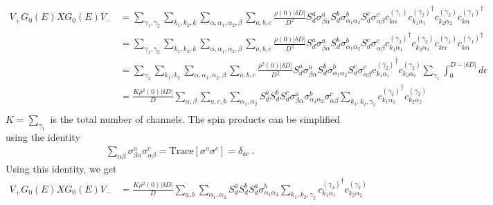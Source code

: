 \documentclass[twoside,11pt]{report}
\numberwithin{equation}{section}
\begin{document}
\begin{equation}\begin{aligned}
	V_+G_0(E)XG_0(E)V_- &=\sum_{\gamma_1,\gamma_2}\sum_{k_1,k_2,k}\sum_{\alpha,\alpha_1,\alpha_2,\beta} \sum_{a,b,c}\frac{\rho(0) |\delta D|}{D^2} S_d^a\sigma^a_{\beta \alpha}S_d^b\sigma^b_{\alpha_1 \alpha_2}S_d^c \sigma^c_{\alpha \beta} c^{(\gamma_1)}_{k\alpha}{c^{(\gamma_2)}_{k_1 \alpha_1}}^\dagger c^{(\gamma_2)}_{k_2 \alpha_2} {c^{(\gamma_1)}_{k\alpha}}^\dagger\\
			    &=\sum_{\gamma_1,\gamma_2}\sum_{k_1,k_2,k}\sum_{\alpha,\alpha_1,\alpha_2,\beta} \sum_{a,b,c}\frac{\rho(0) |\delta D|}{D^2} S_d^a\sigma^a_{\beta \alpha}S_d^b\sigma^b_{\alpha_1 \alpha_2}S_d^c \sigma^c_{\alpha \beta} {c^{(\gamma_2)}_{k_1 \alpha_1}}^\dagger c^{(\gamma_2)}_{k_2 \alpha_2}c^{(\gamma_1)}_{k\alpha}{c^{(\gamma_1)}_{k\alpha}}^\dagger \\
			    &=\sum_{\gamma_2}\sum_{k_1,k_2}\sum_{\alpha,\alpha_1,\alpha_2,\beta} \sum_{a,b,c}\frac{\rho^2(0) |\delta D|}{D^2} S_d^a\sigma^a_{\beta \alpha}S_d^b\sigma^b_{\alpha_1 \alpha_2}S_d^c\sigma^c_{\alpha \beta}{c^{(\gamma_2)}_{k_1 \alpha_1}}^\dagger c^{(\gamma_2)}_{k_2 \alpha_2} \sum_{\gamma_1}\int_{0}^{D - |\delta D|}d \epsilon \\
			    &=\frac{K \rho^2(0) |\delta D|}{D} \sum_{\alpha,\beta} \sum_{a,c,b}\sum_{\alpha_1,\alpha_2}S_d^a S_d^b S_d^c\sigma^a_{\beta \alpha} \sigma^b_{\alpha_1 \alpha_2} \sigma^c_{\alpha \beta} \sum_{k_1,k_2,\gamma_2}{c^{(\gamma_2)}_{k_1 \alpha_1}}^\dagger c^{(\gamma_2)}_{k_2 \alpha_2}\\
\end{aligned}\end{equation}
\(K = \sum_{\gamma_1}\) is the total number of channels. The spin products can be simplified using the identity 
\begin{equation}\begin{aligned}
	\sum_{\alpha\beta}\sigma^a_{\beta \alpha} \sigma^c_{\alpha \beta} = \text{Trace}\left[\sigma^a \sigma^c\right] = \delta_{ac}~.
\end{aligned}\end{equation}
Using this identity, we get
\begin{equation}\begin{aligned}
	V_+G_0(E)XG_0(E)V_- &=\frac{K \rho^2(0) |\delta D|}{D} \sum_{a,b}\sum_{\alpha_1,\alpha_2}S_d^a S_d^b S_d^a \sigma^b_{\alpha_1 \alpha_2} \sum_{k_1,k_2,\gamma_2}{c^{(\gamma_2)}_{k_1 \alpha_1}}^\dagger c^{(\gamma_2)}_{k_2 \alpha_2}\\
\end{aligned}\end{equation}
\end{document}
